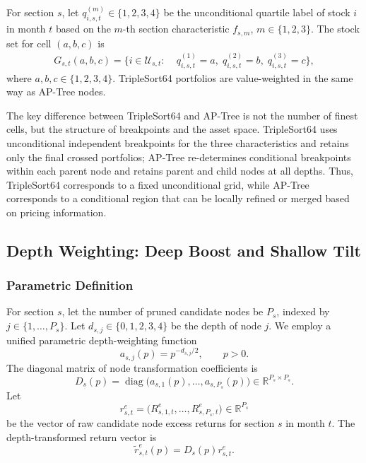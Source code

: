 \documentclass[12pt]{article}
\def\bm#1{#1}%
\def\top{}%
\begin{document}
For section \(s\), let \(q_{i,s,t}^{(m)}\in\{1,2,3,4\}\) be the unconditional quartile label of stock \(i\) in month \(t\) based on the \(m\)-th section characteristic \(f_{s,m}\), \(m\in\{1,2,3\}\). The stock set for cell \((a,b,c)\) is
\begin{equation}
  \begin{aligned}
  G_{s,t}(a,b,c)
  =\bigl\{i\in\mathcal U_{s,t}:\;&
    q_{i,s,t}^{(1)}=a,\;
    q_{i,s,t}^{(2)}=b,\;
    q_{i,s,t}^{(3)}=c
  \bigr\},
  \end{aligned}
  \label{eq:triple_group}
\end{equation}
where \(a,b,c\in\{1,2,3,4\}\). TripleSort64 portfolios are value-weighted in the same way as AP-Tree nodes.

The key difference between TripleSort64 and AP-Tree is not the number of finest cells, but the structure of breakpoints and the asset space. TripleSort64 uses unconditional independent breakpoints for the three characteristics and retains only the final crossed portfolios; AP-Tree re-determines conditional breakpoints within each parent node and retains parent and child nodes at all depths. Thus, TripleSort64 corresponds to a fixed unconditional grid, while AP-Tree corresponds to a conditional region that can be locally refined or merged based on pricing information.

\subsection{Depth Weighting: Deep Boost and Shallow Tilt}
\label{subsec:depth_weight}

\subsubsection{Parametric Definition}

For section \(s\), let the number of pruned candidate nodes be \(P_s\), indexed by \(j\in\{1,\ldots,P_s\}\). Let \(d_{s,j}\in\{0,1,2,3,4\}\) be the depth of node \(j\). We employ a unified parametric depth-weighting function
\begin{equation}
  a_{s,j}(p)
  =
  p^{-d_{s,j}/2},
  \qquad p>0.
  \label{eq:general_depth_weight}
\end{equation}
The diagonal matrix of node transformation coefficients is
\begin{equation}
  \bm D_s(p)
  =
  \operatorname{diag}
  \bigl(
    a_{s,1}(p),\ldots,a_{s,P_s}(p)
  \bigr)
  \in\mathbb R^{P_s\times P_s}.
  \label{eq:depth_matrix}
\end{equation}
Let
\begin{equation}
  \bm r_{s,t}^{e}
  =
  \bigl(
    R_{s,1,t}^{e},\ldots,R_{s,P_s,t}^{e}
  \bigr)^{\top}
  \in\mathbb R^{P_s}
  \label{eq:candidate_return_vector}
\end{equation}
be the vector of raw candidate node excess returns for section \(s\) in month \(t\). The depth-transformed return vector is
\begin{equation}
  \widetilde{\bm r}_{s,t}^{e}(p)
  =
  \bm D_s(p)\bm r_{s,t}^{e}.
  \label{eq:depth_transformed_returns}
\end{equation}
\end{document}
